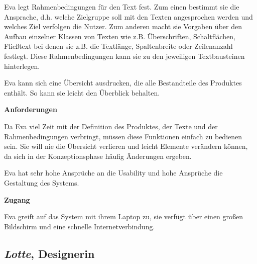 \begin{multicols}{2}
Eva legt Rahmenbedingungen für den Text fest. Zum einen bestimmt sie die Ansprache, d.h. welche Zielgruppe soll mit den Texten angesprochen werden und welches Ziel verfolgen die Nutzer. Zum anderen macht sie Vorgaben über den Aufbau einzelner Klassen von Texten wie z.B. Überschriften, Schaltflächen, Fließtext bei denen sie z.B. die Textlänge, Spaltenbreite oder Zeilenanzahl festlegt. Diese Rahmenbedingungen kann sie zu den jeweiligen Textbausteinen hinterlegen.

Eva kann sich eine Übersicht ausdrucken, die alle Bestandteile des Produktes enthält. So kann sie leicht den Überblick behalten.

\textbf{Anforderungen}

Da Eva viel Zeit mit der Definition des Produktes, der Texte und der Rahmenbedingungen verbringt, müssen diese Funktionen einfach zu bedienen sein. Sie will nie die Übersicht verlieren und leicht Elemente verändern können, da sich in der Konzeptionsphase häufig Änderungen ergeben. 

Eva hat sehr hohe Ansprüche an die Usability und hohe Ansprüche die Gestaltung des Systems.

\textbf{Zugang}

Eva greift auf das System mit ihrem Laptop zu, sie verfügt über einen großen Bildschirm und eine schnelle Internetverbindung.

\end{multicols}

\pagebreak

\subsection{\emph{Lotte}, Designerin}\label{p:lotte}

